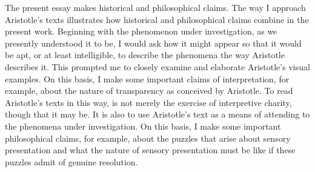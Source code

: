 The present essay makes historical and philosophical claims. The way I approach Aristotle's texts illustrates how historical and philosophical claims combine in the present work. Beginning with the phenomenon under investigation, as we presently understood it to be, I would ask how it might appear so that it would be apt, or at least intelligible, to describe the phenomena the way Aristotle describes it. This prompted me to closely examine and elaborate Aristotle's visual examples. On this basis, I make some important claims of interpretation, for example, about the nature of transparency as conceived by Aristotle. To read Aristotle's texts in this way, is not merely the exercise of interpretive charity, though that it may be. It is also to use Aristotle's text as a means of attending to the phenomena under investigation. On this basis, I make some important philosophical claims, for example, about the puzzles that arise about sensory presentation and what the nature of sensory presentation must be like if these puzzles admit of genuine resolution.

